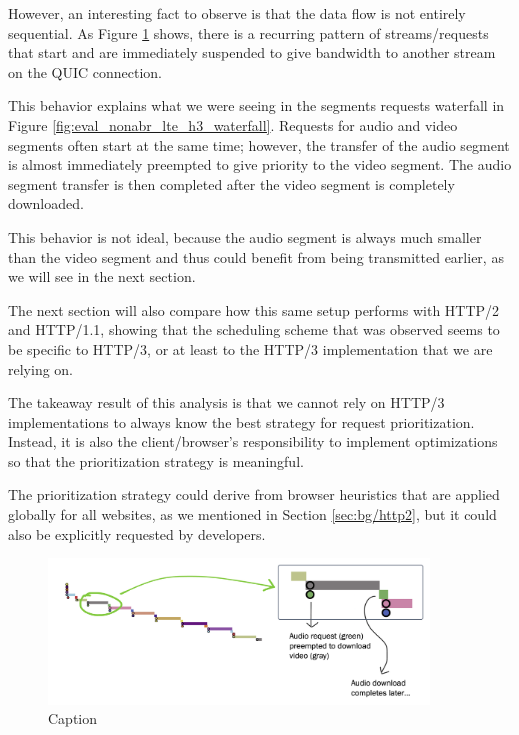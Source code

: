 However, an interesting fact to observe is that the data flow is not entirely sequential. As Figure \ref{fig:eval_noabr_qvis2} shows, there is a recurring pattern of streams/requests that start and are immediately suspended to give bandwidth to another stream on the QUIC connection.

This behavior explains what we were seeing in the segments requests waterfall in Figure \ref{fig:eval_nonabr_lte_h3_waterfall}. Requests for audio and video segments often start at the same time; however, the transfer of the audio segment is almost immediately preempted to give priority to the video segment. The audio segment transfer is then completed after the video segment is completely downloaded.

This behavior is not ideal, because the audio segment is always much smaller than the video segment and thus could benefit from being transmitted earlier, as we will see in the next section.

The next section will also compare how this same setup performs with HTTP/2 and HTTP/1.1, showing that the scheduling scheme that was observed seems to be specific to HTTP/3, or at least to the HTTP/3 implementation that we are relying on.

The takeaway result of this analysis is that we cannot rely on HTTP/3 implementations to always know the best strategy for request prioritization. Instead, it is also the client/browser's responsibility to implement optimizations so that the prioritization strategy is meaningful.

The prioritization strategy could derive from browser heuristics that are applied globally for all websites, as we mentioned in Section \ref{sec:bg/http2}, but it could also be explicitly requested by developers.

\begin{figure}[h]
    \centering
    \includegraphics[width=0.9\textwidth]{res/eval_noabr_qvis2.png}
    \caption{Caption}
    \label{fig:eval_noabr_qvis2}
\end{figure}

